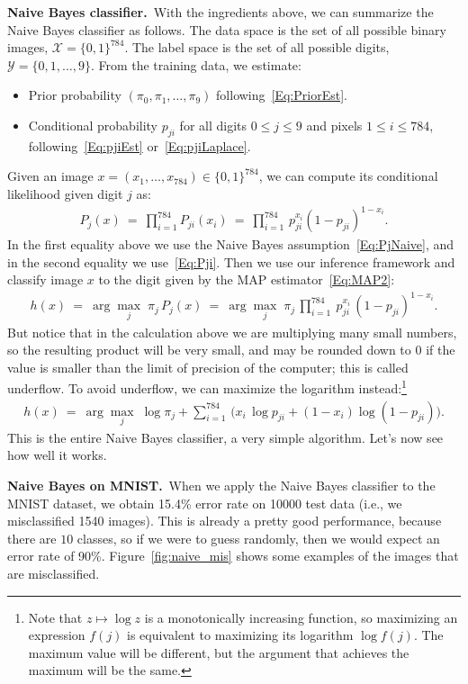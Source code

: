 \documentclass[11pt]{article}
\newcounter{thm}
\def\X{\mathcal{X}}
\def\Y{\mathcal{Y}}
\begin{document}
\medskip
{\bf Naive Bayes classifier.}~With the ingredients above, we can summarize the Naive Bayes classifier as follows. The data space is the set of all possible binary images, $\X = \{0,1\}^{784}$. The label space is the set of all possible digits, $\Y = \{0,1,\dots,9\}$. From the training data, we estimate:
\begin{itemize}
  \item Prior probability $(\pi_0, \pi_1, \dots, \pi_9)$ following~\eqref{Eq:PriorEst}.
  \item Conditional probability $p_{ji}$ for all digits $0 \le j \le 9$ and pixels $1 \le i \le 784$, following~\eqref{Eq:pjiEst} or~\eqref{Eq:pjiLaplace}.
\end{itemize}
Given an image $x = (x_1,\dots,x_{784}) \in \{0,1\}^{784}$, we can compute its conditional likelihood given digit $j$ as:
\begin{align*}
P_j(x) ~=~ \prod_{i=1}^{784} P_{ji}(x_i) ~=~ \prod_{i=1}^{784} \, p_{ji}^{x_i} (1-p_{ji})^{1-x_i}.
\end{align*}
In the first equality above we use the Naive Bayes assumption~\eqref{Eq:PjNaive}, and in the second equality we use~\eqref{Eq:Pji}. Then we use our inference framework and classify image $x$ to the digit given by the MAP estimator~\eqref{Eq:MAP2}:
\begin{align*}
h(x) ~=~ \arg\max_j \; \pi_j \, P_j(x)
~=~ \arg\max_j \; \pi_j \, \prod_{i=1}^{784} \: p_{ji}^{x_i} \, (1-p_{ji})^{1-x_i}.
\end{align*}
But notice that in the calculation above we are multiplying many small numbers, so the resulting product will be very small, and may be rounded down to $0$ if the value is smaller than the limit of precision of the computer; this is called underflow. To avoid underflow, we can maximize the logarithm instead:\footnote{Note that $z \mapsto \log z$ is a monotonically increasing function, so maximizing an expression $f(j)$ is equivalent to maximizing its logarithm $\log f(j)$. The maximum value will be different, but the argument that achieves the maximum will be the same.}
\begin{align*}
h(x)
~=~ \arg\max_j \; \log \pi_j + \sum_{i=1}^{784} \, \Big( x_i \, \log p_{ji} + (1-x_i) \log (1-p_{ji}) \Big).
\end{align*}
This is the entire Naive Bayes classifier, a very simple algorithm. Let's now see how well it works.

\medskip
{\bf Naive Bayes on MNIST.}~When we apply the Naive Bayes classifier to the MNIST dataset, we obtain 15.4\% error rate on 10000 test data (i.e., we misclassified 1540 images). This is already a pretty good performance, because there are $10$ classes, so if we were to guess randomly, then we would expect an error rate of 90\%. Figure~\ref{fig:naive_mis} shows some examples of the images that are misclassified.
\end{document}
